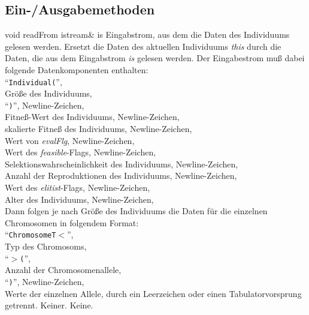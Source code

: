 \documentclass{report}
\begin{document}
\newpage

\subsection{Ein-/Ausgabemethoden}

\setNormalInstance
\printMethodWithOneParam
{void}
{readFrom}
{istream\&}
{is}
{Eingabstrom, aus dem die Daten des Individuums gelesen
                         werden.}
{Ersetzt die Daten des aktuellen Individuums {\em this} durch die Daten, die
    aus dem Eingabstrom {\em is} gelesen werden. Der Eingabestrom mu{\ss} dabei
    folgende Datenkomponenten enthalten:\\
    ``{\tt Individual(}'',\\
    Gr\"o{\ss}e des Individuums,\\ 
    ``{\tt )}'', Newline-Zeichen,\\ 
    Fitne{\ss}-Wert des Individuums, Newline-Zeichen,\\
    skalierte Fitne{\ss} des Individuums, Newline-Zeichen,\\
    Wert von {\em evalFlg}, Newline-Zeichen,\\
    Wert des {\em feasible}-Flags, Newline-Zeichen,\\
    Selektionswahrscheinlichkeit des Individuums, Newline-Zeichen,\\
    Anzahl der Reproduktionen des Individuums, Newline-Zeichen,\\
    Wert des {\em elitist}-Flags, Newline-Zeichen,\\
    Alter des Individuums, Newline-Zeichen,\\
    Dann folgen je nach Gr\"o{\ss}e des Individuums die Daten f\"ur die 
    einzelnen Chromosomen in folgendem Format:\\
    ``{\tt ChromosomeT$<$}'',\\
    Typ des Chromosoms,\\ 
    ``{\tt $>$(}'',\\ 
    Anzahl der Chromosomenallele,\\
    ``{\tt )}'', Newline-Zeichen,\\
    Werte der einzelnen Allele, durch ein Leerzeichen oder einen
    Tabulatorvorsprung getrennt.}
{Keiner.}
{Keine.}

\vspace{4ex}
\end{document}

